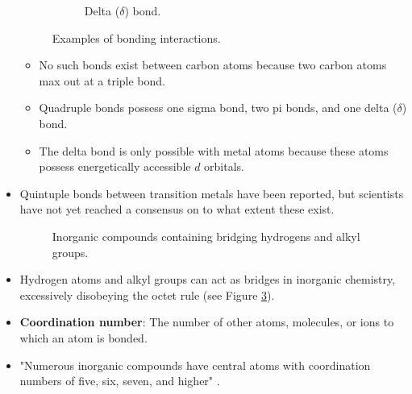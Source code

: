 \documentclass[../main.tex]{subfiles}
\begin{document}
\begin{itemize}
\begin{figure}[h!]
\begin{subfigure}[b]{0.3\linewidth}
            \caption{Delta ($\delta$) bond.}
            \label{fig:sigmaPiDeltac}
        \end{subfigure}
        \caption{Examples of bonding interactions.}
        \label{fig:sigmaPiDelta}
    \end{figure}
    \begin{itemize}
        \item No such bonds exist between carbon atoms because two carbon atoms max out at a triple bond.
        \item Quadruple bonds possess one sigma bond, two pi bonds, and one delta ($\delta$) bond.
        \item The delta bond is only possible with metal atoms because these atoms possess energetically accessible $d$ orbitals.
    \end{itemize}
    \item Quintuple bonds between transition metals have been reported, but scientists have not yet reached a consensus on to what extent these exist.
    \begin{figure}[h!]
        \centering
        \footnotesize
        \hspace{5em}
        \caption{Inorganic compounds containing bridging hydrogens and alkyl groups.}
        \label{fig:bridgingH-CH3}
    \end{figure}
    \item Hydrogen atoms and alkyl groups can act as bridges in inorganic chemistry, excessively disobeying the octet rule (see Figure \ref{fig:bridgingH-CH3}).
    \item \textbf{Coordination number}: The number of other atoms, molecules, or ions to which an atom is bonded.
    \item "Numerous inorganic compounds have central atoms with coordination numbers of five, six, seven, and higher" \parencite[2]{bib:MiesslerFischerTarr}.

\end{itemize}
\end{document}

